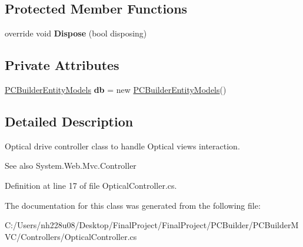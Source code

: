 \subsection*{Protected Member Functions}
\begin{DoxyCompactItemize}
\item 
override void {\bfseries Dispose} (bool disposing)\hypertarget{class_p_c_builder_m_v_c_1_1_controllers_1_1_optical_controller_a25e4700610f3e58e07a3ef2cfbe12330}{}\label{class_p_c_builder_m_v_c_1_1_controllers_1_1_optical_controller_a25e4700610f3e58e07a3ef2cfbe12330}

\end{DoxyCompactItemize}
\subsection*{Private Attributes}
\begin{DoxyCompactItemize}
\item 
\hyperlink{class_p_c_builder_m_v_c_1_1_models_1_1_p_c_builder_entity_models}{P\+C\+Builder\+Entity\+Models} {\bfseries db} = new \hyperlink{class_p_c_builder_m_v_c_1_1_models_1_1_p_c_builder_entity_models}{P\+C\+Builder\+Entity\+Models}()\hypertarget{class_p_c_builder_m_v_c_1_1_controllers_1_1_optical_controller_a5391c12ed8f836eac784c9247511a411}{}\label{class_p_c_builder_m_v_c_1_1_controllers_1_1_optical_controller_a5391c12ed8f836eac784c9247511a411}

\end{DoxyCompactItemize}


\subsection{Detailed Description}
Optical drive controller class to handle Optical views interaction. 

\begin{DoxySeeAlso}{See also}
System.\+Web.\+Mvc.\+Controller


\end{DoxySeeAlso}


Definition at line 17 of file Optical\+Controller.\+cs.



The documentation for this class was generated from the following file\+:\begin{DoxyCompactItemize}
\item 
C\+:/\+Users/nh228u08/\+Desktop/\+Final\+Project/\+Final\+Project/\+P\+C\+Builder/\+P\+C\+Builder\+M\+V\+C/\+Controllers/Optical\+Controller.\+cs\end{DoxyCompactItemize}
